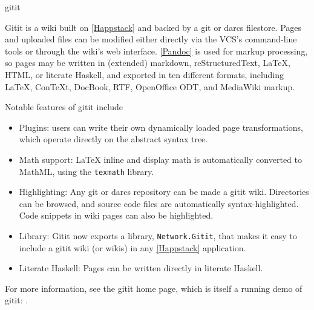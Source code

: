 \begin{hcarentry}[updated]{gitit}
\label{gitit}
\makeheader

Gitit is a wiki built on \cref{Happstack} and backed by a git or darcs
filestore. Pages and uploaded files can be modified either directly
via the VCS's command-line tools or through the wiki's web interface.
\cref{Pandoc} is used for markup processing, so pages may be written in
(extended) markdown, reStructuredText, LaTeX, HTML, or literate Haskell,
and exported in ten different formats, including LaTeX, ConTeXt,
DocBook, RTF, OpenOffice ODT, and MediaWiki markup.

Notable features of gitit include
\begin{itemize}
\item
  Plugins: users can write their own dynamically loaded page transformations,
  which operate directly on the abstract syntax tree.
\item
  Math support:  LaTeX inline and display math is automatically converted
  to MathML, using the \texttt{texmath} library.
\item
  Highlighting:  Any git or darcs repository can be made a gitit wiki.
  Directories can be browsed, and source code files are
  automatically syntax-highlighted.  Code snippets in wiki pages
  can also be highlighted.
\item
  Library: Gitit now exports a library, \texttt{Network.Gitit}, that makes it
  easy to include a gitit wiki (or wikis) in any \cref{Happstack} application.
\item
  Literate Haskell: Pages can be written directly in literate Haskell.
\end{itemize}

\FurtherReading
For more information, see the gitit home page, which is itself
a running demo of gitit:  .
\end{hcarentry}
